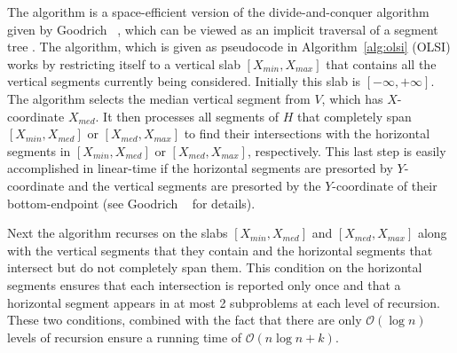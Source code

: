 \documentclass{elsart}
\newcommand{\Oh}[1]{\ensuremath{\mathcal{O}(#1)}}
\begin{document}
The algorithm is a space-efficient version of the divide-and-conquer
algorithm given by Goodrich \etal\ \cite{goodrich:external}, which can
be viewed as an implicit traversal of a segment tree
\cite[Section~1.2.3.1]{preparata:computational}.  The algorithm, which
is given as pseudocode in Algorithm~\ref{alg:olsi} (\textsc{OLSI})
works by restricting itself to a vertical slab $[X_{min},X_{max}]$
that contains all the vertical segments currently being considered.
Initially this slab is $[-\infty,+\infty]$.  The algorithm selects the
median vertical segment from $V$, which has $X$-coordinate $X_{med}$.
It then processes all segments of $H$ that completely span
$[X_{min},X_{med}]$ or $[X_{med},X_{max}]$ to find their intersections
with the horizontal segments in $[X_{min},X_{med}]$ or
$[X_{med},X_{max}]$, respectively.  This last step is easily
accomplished in linear-time if the horizontal segments are presorted
by $Y$-coordinate and the vertical segments are presorted by the
$Y$-coordinate of their bottom-endpoint (see Goodrich \etal\
\cite{goodrich:external} for details).

Next the algorithm recurses on the slabs $[X_{min},X_{med}]$ and
$[X_{med},X_{max}]$ along with the vertical segments that they contain
and the horizontal segments that intersect but do not completely span
them.  This condition on the horizontal segments ensures that each
intersection is reported only once and that a horizontal segment
appears in at most 2 subproblems at each level of recursion.  These
two conditions, combined with the fact that there are only $\Oh{\log n}$
levels of recursion ensure a running time of $\Oh{n\log n + k}$.
\end{document}
